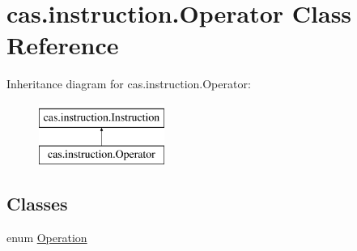 \hypertarget{classcas_1_1instruction_1_1_operator}{\section{cas.\-instruction.\-Operator Class Reference}
\label{classcas_1_1instruction_1_1_operator}
}
Inheritance diagram for cas.\-instruction.\-Operator\-:\begin{figure}[H]
\begin{center}
\leavevmode
\includegraphics[height=2.000000cm]{classcas_1_1instruction_1_1_operator}
\end{center}
\end{figure}
\subsection*{Classes}
\begin{DoxyCompactItemize}
\item 
enum \hyperlink{enumcas_1_1instruction_1_1_operator_1_1_operation}{Operation}
\end{DoxyCompactItemize}
